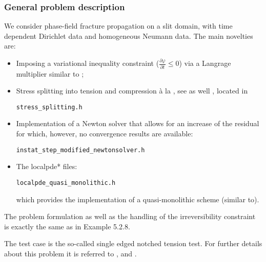 \subsubsection{General problem description}
We consider phase-field fracture propagation on a slit domain, with time dependent 
Dirichlet data and homogeneous Neumann data.
The main novelties are:
\begin{itemize}
\item Imposing a variational inequality constraint ($\frac{\partial \varphi}{\partial t} \leq 0$)
via a Langrage multiplier similar to  \cite{mang2020phase};
\item Stress splitting into tension and compression \`a
la \cite{MieWelHof10a}, see as well \cite{AmorMarigoMaurini2009}, located 
in 
\begin{verbatim}
stress_splitting.h
\end{verbatim}
\item Implementation of a Newton solver that 
allows for an increase of the residual for which, however,
no convergence results are available:
\begin{verbatim}
instat_step_modified_newtonsolver.h
\end{verbatim}
\item The localpde* files:
\begin{verbatim}
localpde_quasi_monolithic.h
\end{verbatim}
which provides the implementation of a quasi-monolithic scheme
(similar to\cite{HeWheWi15}).
\end{itemize}

The problem formulation as well as the handling of the irreversibility constraint is exactly the same as in Example 5.2.8.


The test case is the so-called single edged notched 
tension test. For further details about this problem it is referred
to \cite{MieHofWel2010,BoVeScoHuLa12}, and \cite{WeWiWo2014}.




%
%



